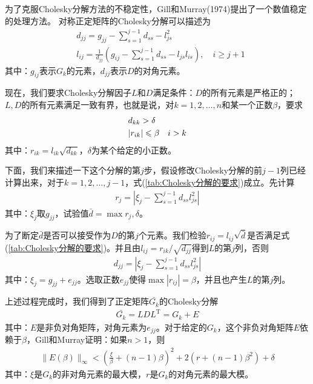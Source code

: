         \par
        为了克服Cholesky分解方法的不稳定性，Gill和Murray(1974)提出了一个数值稳定的处理方法。
        对称正定矩阵的Cholesky分解可以描述为
         \begin{align*}
          & d_{jj}=g_{jj}-{\mathop {\sum} \limits_{s=1}^{j-1} d_{ss}}-l_{js}^2\\
          & l_{ij}=\frac{1}{d_{jj}} \left( g_{ij}-{\mathop {\sum} \limits_{s=1}^{j-1} d_{ss}}-l_{js}l_{is} \right) , \quad i \geqslant {j+1}
        \end{align*}
        其中：$g_{ij}$表示$G_k$的元素，$d_{jj}$表示$D$的对角元素。
        \par
        现在，我们要求Cholesky分解因子$L$和$D$满足条件：$D$的所有元素是严格正的；$L,D$的所有元素满足一致有界，也就是说，对$k=1,2,\dots,n$和某一个正数$\beta$，要求
         \begin{align}\label{tab:Cholesky分解的要求}
          & d_{kk}> \delta  \notag \\
          & |r_{ik}| \leqslant \beta \quad i>k
        \end{align}
        其中：$r_{ik}=l_{ik}\sqrt{d_{kk}}$，$\delta$为某个给定的小正数。
        \par
        下面，我们来描述一下这个分解的第$j$步，假设修改Cholesky分解的前$j-1$列已经计算出来，对于$k=1,2,\ldots,j-1$，式(\ref{tab:Cholesky分解的要求})成立。先计算
         \begin{align*}
        {r_j}=\left|{\xi}_j-{\mathop {\sum} \limits_{s=1}^{j-1} d_{ss}l_{js}^2}\right|
        \end{align*}
        其中：${\xi}_j$取$g_{jj}$，试验值$\bar{d}=\max{r_j,\delta}$。\par
        为了断定$\bar{d}$是否可以接受作为$D$的第$j$个元素。我们检验$r_{ij}=l_{ij}\sqrt{\bar{d}}$是否满足式(\ref{tab:Cholesky分解的要求})。并且由$l_{ij}=r_{ik}/\sqrt{d_{jj}}$得到$L$的第$j$列，否则
         \begin{align*}
        d_{jj}=\left|{\xi}_j-{\mathop {\sum} \limits_{s=1}^{j-1} d_{ss}l_{js}^2}\right|
        \end{align*}
        其中：${\xi}_j=g_{jj}+e_{jj}$。选取正数$e_{jj}$使得$\max |r_{ij}|=\beta$，并且也产生$L$的第$j$列。
        \par
        上述过程完成时，我们得到了正定矩阵$\bar{G_k}$的Cholesky分解
         \begin{align*}
        \bar{G_k}={LDL}^\mathrm{T} =G_k+E
        \end{align*}
        其中：$E$是非负对角矩阵，对角元素为$e_{jj}$。对于给定的$G_k$，这个非负对角矩阵$E$依赖于$\beta$，Gill和Murray证明：如果$n>1$，则
        \begin{align*}
        \|E(\beta)\|_\infty <(\frac{\xi}{\beta}+(n-1)\beta)^2+2(r+(n-1){\beta}^2)+\delta
        \end{align*}
        其中：$\xi$是$G_k$的非对角元素的最大模，$r$是$G_k$的对角元素的最大模。
